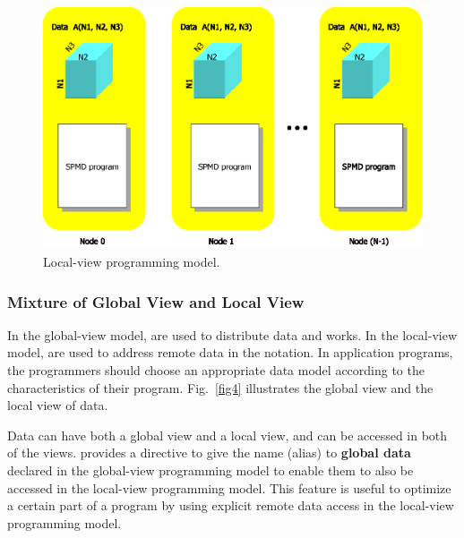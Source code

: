 \begin{figure}
  \centering
  \includegraphics[width=12cm]{figs/Fig3.eps}
  \caption{Local-view programming model.}
\label{fig3}
\end{figure}


\subsubsection{Mixture of Global View and Local View}

In the global-view model, {\nodes} are used to distribute data and works. In the
local-view model, {\nodes} are used to address remote data in the {\coarray}
notation.
%
In application programs,
the programmers should choose an appropriate data model according to the
characteristics of their program. Fig.~\ref{fig4} illustrates the global view
and the local view of data.

Data can have both a global view and a local view, and can be accessed
in both of the views. {\XMP} provides a directive to give the {\local} name
(alias) to {\bf global data} declared in the global-view programming model
to enable them to also be accessed in the local-view programming
model. This feature is useful to optimize a certain part of a program
by using explicit remote data access in the local-view programming
model.

